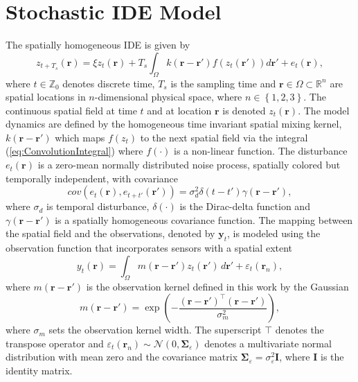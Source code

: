 \documentclass[10pt,twocolumn,twoside]{IEEEtran}
\begin{document}
\section{Stochastic IDE Model}
The spatially homogeneous IDE is given by
\begin{equation}
 z_{t+T_s}\left(\mathbf{r}\right)=\xi z_t(\mathbf{r})+T_s\int_{\Omega}k\left(\mathbf{r}-\mathbf{r}'\right)f(z_{t}\left(\mathbf{r}'\right))d\mathbf{r}'+e_{t}\left(\mathbf{r}\right),
\label{eq:ConvolutionIntegral}
\end{equation}
where $t\in \mathbb{Z}_0 $ denotes discrete time, $T_s$ is the sampling time and $\mathbf{r} \in \Omega \subset \mathbb{R}^{n}$ are spatial locations in $n$-dimensional physical space, where $n \in \left\lbrace 1,2,3 \right\rbrace $. The continuous spatial field at time $t$ and at location $\mathbf r$ is denoted $z_t\left(\mathbf r\right)$. The model dynamics  are defined by the homogeneous time invariant spatial mixing kernel, $k\left(\mathbf{r}-\mathbf{r}'\right)$ which maps $f(z_{t})$  to the next spatial field via the integral (\ref{eq:ConvolutionIntegral}) where $f(\cdot)$ is a non-linear function. The disturbance $e_{t}(\mathbf{r})$ is a zero-mean normally distributed noise process, spatially colored but temporally independent, with covariance \cite{Rasmussen2005}
\begin{equation}
cov\left(e_{t}\left(\mathbf{r}\right),e_{t+t'}\left(\mathbf{r'}\right)\right)=\sigma_d^2\delta(t-t')\gamma(\mathbf{r}-\mathbf{r'}),
\label{eq:FieldDisturbance}
\end{equation}
where $\sigma_d$ is temporal disturbance, $\delta(\cdot)$ is the Dirac-delta function and $\gamma(\mathbf{r}-\mathbf{r'})$ is a spatially homogeneous covariance function. The mapping between the spatial field and the observations, denoted by $\mathbf{y}_t$, is modeled using the observation function that incorporates sensors with a spatial extent
\begin{equation}\label{eq:ObservationEquation}
	y_t(\mathbf{r}) = \int_{\Omega} { m\left(\mathbf{r}-\mathbf{r}'\right) z_t\left(\mathbf{r}'\right) \, d\mathbf{r}'} + \varepsilon_t(\mathbf{r}_n), 
\end{equation}
where $m\left(\mathbf{r}-\mathbf{r}'\right)$ is the observation kernel defined in this work by the Gaussian
\begin{equation}\label{eq:observationkernel}
	m\left(\mathbf{r}-\mathbf{r}'\right) = \exp{\left(-\frac{(\mathbf{r}-\mathbf{r}')^\top(\mathbf{r}-\mathbf{r}')}{\sigma_m^2}\right)},
\end{equation}
where $\sigma_m$ sets the observation kernel width. The superscript $\top$ denotes the transpose operator and $\varepsilon_t(\mathbf{r}_n) \sim \mathcal{N}\left(0,\boldsymbol{\Sigma}_{\varepsilon}\right)$ denotes a multivariate normal distribution with mean zero and the covariance matrix $\boldsymbol{\Sigma}_{\varepsilon} = \sigma_{\varepsilon}^2\mathbf{I}$, where $\mathbf{I}$ is the identity matrix.
\end{document}
